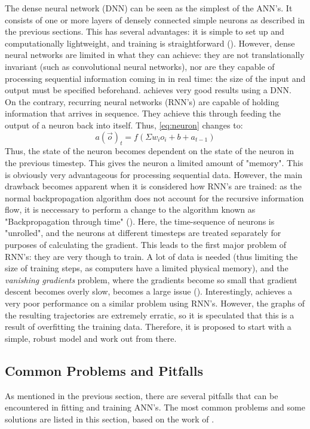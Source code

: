 The dense neural network (DNN) can be seen as the simplest of the ANN's. It consists of one or more layers of densely connected simple neurons as described in the previous sections. This has several advantages: it is simple to set up and computationally lightweight, and training is straightforward (\cite{nnbooktwo}). However, dense neural networks are limited in what they can achieve: they are not translationally invariant (such as convolutional neural networks), nor are they capable of processing sequential information coming in in real time: the size of the input and output must be specified beforehand. \cite{anntrajectoryone} achieves very good results using a DNN.\\

On the contrary, recurring neural networks (RNN's) are capable of holding information that arrives in sequence. They achieve this through feeding the output of a neuron back into itself. Thus, \autoref{eq:neuron} changes to:
\begin{equation}
    a(\vec{o})_t = f(\Sigma w_i o_i + b + a_{t-1})
\end{equation}
Thus, the state of the neuron becomes dependent on the state of the neuron in the previous timestep. This gives the neuron a limited amount of "memory". This is obviously very advantageous for processing sequential data. However, the main drawback becomes apparent when it is considered how RNN's are trained: as the normal backpropagation algorithm does not account for the recursive information flow, it is neccessary to perform a change to the algorithm known as "Backpropagation through time" (\cite{nnbooktwo}). Here, the time-sequence of neurons is "unrolled", and the neurons at different timesteps are treated separately for purposes of calculating the gradient. This leads to the first major problem of RNN's: they are very though to train. A lot of data is needed (thus limiting the size of training steps, as computers have a limited physical memory), and the \textit{vanishing gradients} problem, where the gradients become so small that gradient descent becomes overly slow, becomes a large issue (\cite{nnbookfour}). Interestingly, \cite{trajectorythesis} achieves a very poor performance on a similar problem using RNN's. However, the graphs of the resulting trajectories are extremely erratic, so it is speculated that this is a result of overfitting the training data. Therefore, it is proposed to start with a simple, robust model and work out from there.

\subsection{Common Problems and Pitfalls}
\label{ssec:nnproblems}
As mentioned in the previous section, there are several pitfalls that can be encountered in fitting and training ANN's. The most common problems and some solutions are listed in this section, based on the work of \cite{nnbooktwo}.\\

